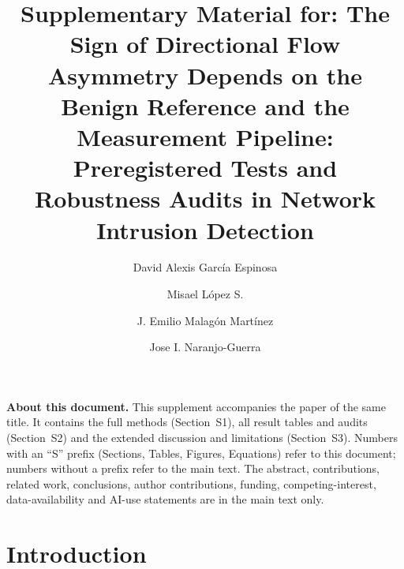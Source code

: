 \documentclass[preprint,12pt]{elsarticle}
\begin{document}
\begin{frontmatter}

\title{Supplementary Material for: The Sign of Directional Flow Asymmetry Depends on the Benign Reference and the Measurement Pipeline: Preregistered Tests and Robustness Audits in Network Intrusion Detection}

\author[inst1,inst2]{David Alexis Garc\'ia Espinosa}
\author[inst1]{Misael L\'opez S.}
\author[inst1]{J. Emilio Malag\'on Mart\'inez}
\author[inst1]{Jose I. Naranjo-Guerra}

\end{frontmatter}

\noindent\textbf{About this document.} This supplement accompanies the paper of the same title. It contains the full methods (Section~S1), all result tables and audits (Section~S2) and the extended discussion and limitations (Section~S3). Numbers with an ``S'' prefix (Sections, Tables, Figures, Equations) refer to this document; numbers without a prefix refer to the main text. The abstract, contributions, related work, conclusions, author contributions, funding, competing-interest, data-availability and AI-use statements are in the main text only.

\section{Introduction}
\end{document}
